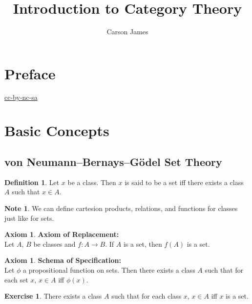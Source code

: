 \documentclass[12pt]{amsart}
\theoremstyle{definition}
\newtheorem{defn}[definition]{Definition}
\newtheorem{ax}[definition]{Axiom}
\newtheorem{note}[definition]{Note}
\newtheorem{ex}[definition]{Exercise}
\DeclareMathOperator*{\0}{\mbf{0}}
\DeclareMathOperator*{\1}{\mbf{1}}
\newcommand{\lex}[1]{\label{ex:#1}}
\newcommand{\ld}[1]{\label{defn:#1}}
\newcommand{\lax}[1]{\label{ax:#1}}
\begin{document}
	
	\title{Introduction to Category Theory}
	\author{Carson James}
	\maketitle
	
	\tableofcontents
	
	\section*{Preface}
	\begin{flushleft}
		\href{https://creativecommons.org/licenses/by-nc-sa/4.0/legalcode.txt}{cc-by-nc-sa}
	\end{flushleft}
	
	
	
	\newpage
	
	
	\newpage
	
	\section{Basic Concepts}
	
	\subsection{von Neumann–Bernays–Gödel Set Theory}
	
	\begin{defn} \ld{11001} 
		Let $x$ be a class. Then $x$ is said to be a set iff there exists a class $A$ such that $x \in A$. 
	\end{defn}

	\begin{note}
		We can define cartesion products, relations, and functions for classes just like for sets. 
	\end{note}
	
	\begin{ax} \lax{11001.1} \textbf{Axiom of Replacement:}  \\
		Let $A$, $B$ be classes and $f:A \rightarrow B$. If $A$ is a set, then $f(A)$ is a set. 
	\end{ax}

	\begin{ax} \lax{11002} \textbf{Schema of Specification:}  \lax{11002}\\
		Let $\phi$ a propositional function on sets. Then there exists a class $A$ such that for each set $x$, $x \in A$ iff $\phi(x)$. 
	\end{ax}
	
	\begin{ex} \lex{11003}
		There exists a class $A$ such that for each class $x$, $x \in A$ iff $x$ is a set.
	\end{ex}
	
\end{document}
